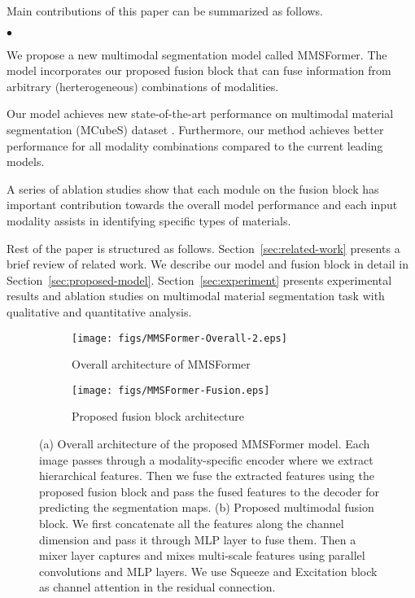 \documentclass{article}
\newcommand{\squishlist}{
   \begin{list}{$\bullet$}
    { \setlength{\itemsep}{0pt}      \setlength{\parsep}{3pt}
      \setlength{\topsep}{3pt}       \setlength{\partopsep}{0pt}
      \setlength{\leftmargin}{1.0em} \setlength{\labelwidth}{1em}
      \setlength{\labelsep}{0.5em} } }
\newcommand{\squishend}{
  \end{list}  }
\begin{document}
Main contributions of this paper can be summarized as follows. 
\squishlist
    \item We propose a new multimodal segmentation model called MMSFormer. The model incorporates our proposed fusion block that can fuse information from arbitrary (herterogeneous) combinations of modalities. 
\item Our model achieves new state-of-the-art performance on multimodal material segmentation (MCubeS) dataset \cite{Liang2022MCubeS}. Furthermore, our method achieves better performance for all modality combinations compared to the current leading models.
\item A series of ablation studies show that each module on the fusion block has important contribution towards the overall model performance and each input modality assists in identifying specific types of materials.
\squishend
Rest of the paper is structured as follows. Section~\ref{sec:related-work} presents a brief review of related work. We describe our model and fusion block in detail in Section~\ref{sec:proposed-model}. Section~\ref{sec:experiment} presents experimental results and ablation studies on multimodal material segmentation task with qualitative and quantitative analysis.


\begin{figure*}[t]
     \centering
     \begin{subfigure}[b]{0.80\textwidth}
         \centering
         \texttt{[image: figs/MMSFormer-Overall-2.eps]}
         \caption{Overall architecture of MMSFormer}
         \label{fig:model}
     \end{subfigure}
     \hfill
     \begin{subfigure}[b]{0.80\textwidth}
         \centering
         \texttt{[image: figs/MMSFormer-Fusion.eps]}
         \caption{Proposed fusion block architecture}
         \label{fig:fusion}
     \end{subfigure}
    \caption{(a) Overall architecture of the proposed MMSFormer model. Each image passes through a modality-specific encoder where we extract hierarchical features. Then we fuse the extracted features using the proposed fusion block and pass the fused features to the decoder for predicting the segmentation maps. (b) Proposed multimodal fusion block. We first concatenate all the features along the channel dimension and pass it through MLP layer to fuse them. Then a mixer layer captures and mixes multi-scale features using parallel convolutions and MLP layers. We use Squeeze and Excitation block as channel attention in the residual connection.}
    \label{fig:model-architecture}
\end{figure*}
\end{document}
